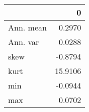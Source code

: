 \begin{tabular}{lr}
\toprule
{} &        0 \\
\midrule
Ann. mean &   0.2970 \\
Ann. var  &   0.0288 \\
skew      &  -0.8794 \\
kurt      &  15.9106 \\
min       &  -0.0944 \\
max       &   0.0702 \\
\bottomrule
\end{tabular}
